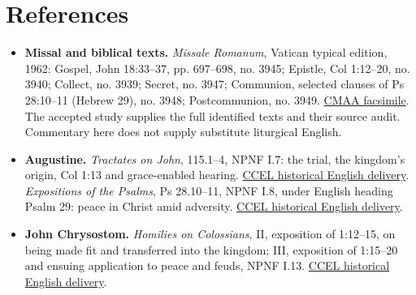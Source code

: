\section{References}
\begin{itemize}[leftmargin=1.2em,itemsep=.4em]
\item \textbf{Missal and biblical texts.} \emph{Missale Romanum}, Vatican typical edition, 1962: Gospel, John 18:33--37, pp. 697--698, no. 3945; Epistle, Col 1:12--20, no. 3940; Collect, no. 3939; Secret, no. 3947; Communion, selected clauses of Ps 28:10--11 (Hebrew 29), no. 3948; Postcommunion, no. 3949. \href{https://media.churchmusicassociation.org/pdf/missale62.pdf}{CMAA facsimile}. The accepted study supplies the full identified texts and their source audit. Commentary here does not supply substitute liturgical English.
\item \textbf{Augustine.} \emph{Tractates on John}, 115.1--4, NPNF I.7: the trial, the kingdom's origin, Col 1:13 and grace-enabled hearing. \href{https://www.ccel.org/ccel/schaff/npnf107.html}{CCEL historical English delivery}. \emph{Expositions of the Psalms}, Ps 28.10--11, NPNF I.8, under English heading Psalm 29: peace in Christ amid adversity. \href{https://www.ccel.org/ccel/schaff/npnf108.html}{CCEL historical English delivery}.
\item \textbf{John Chrysostom.} \emph{Homilies on Colossians}, II, exposition of 1:12--15, on being made fit and transferred into the kingdom; III, exposition of 1:15--20 and ensuing application to peace and feuds, NPNF I.13. \href{https://www.ccel.org/ccel/schaff/npnf113.html}{CCEL historical English delivery}.
\end{itemize}
